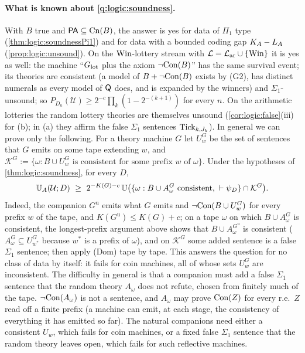 \paragraph{What is known about \cref{q:logic:soundness}.} With $B$ true and $\mathsf{PA}\subseteq\mathrm{Cn}(B)$, the answer is yes for data of $\Pi_1$ type (\cref{thm:logic:soundnessPi1}) and for data with a bounded coding gap $K_{A}-L_{A}$ (\cref{prop:logic:unsound}). On the $\mathrm{Win}$-lottery stream with $\mathcal L=\mathcal{L}_{\mathrm{ar}}\cup\{\mathrm{Win}\}$ it is yes as well: the machine ``$G_{\mathrm{lot}}$ plus the axiom $\neg\mathrm{Con}(B)$'' has the same survival event; its theories are consistent (a model of $B+\neg\mathrm{Con}(B)$ exists by (G2), has distinct numerals as every model of $\mathsf{Q}$ does, and is expanded by the winners) and $\Sigma_1$-unsound; so $P_{D_n}(\mathcal U)\ge2^{-c}\prod_k(1-2^{-(k+1)})$ for every $n$. On the arithmetic lotteries the random lottery theories are themselves unsound (\cref{cor:logic:false}(iii) for (b); in (a) they affirm the false $\Sigma_1$ sentences $\mathrm{Tick}_{k,J_k}$). In general we can prove only the following. For a theory machine $G$ let $U^G_w$ be the set of sentences that $G$ emits on some tape extending $w$, and $\mathcal K^G:=\{\omega:B\cup U^G_w\text{ is consistent for some prefix }w\text{ of }\omega\}$. Under the hypotheses of \cref{thm:logic:soundness}, for every $D$,
\[
\UA(\mathcal U;D)\ \ge\ 2^{-K(G)-c}\,\Unif\big(\{\omega:B\cup A^G_\omega\text{ consistent},\ \vdash\psi_D\}\cap\mathcal K^G\big).
\]
Indeed, the companion $G^{\mathrm u}$ emits what $G$ emits and $\neg\mathrm{Con}(B\cup U^G_w)$ for every prefix $w$ of the tape, and $K(G^{\mathrm u})\le K(G)+c$; on a tape $\omega$ on which $B\cup A^G_\omega$ is consistent, the longest-prefix argument above shows that $B\cup A^{G^{\mathrm u}}_\omega$ is consistent ($A^G_\omega\subseteq U^G_{w^*}$ because $w^*$ is a prefix of $\omega$), and on $\mathcal K^G$ some added sentence is a false $\Sigma_1$ sentence; then apply (Dom) tape by tape. This answers the question for no class of data by itself: it fails for coin machines, all of whose sets $U^G_w$ are inconsistent. The difficulty in general is that a companion must add a false $\Sigma_1$ sentence that the random theory $A_\omega$ does not refute, chosen from finitely much of the tape. $\neg\mathrm{Con}(A_\omega)$ is not a sentence, and $A_\omega$ may prove $\mathrm{Con}(Z)$ for every r.e.\ $Z$ read off a finite prefix (a machine can emit, at each stage, the consistency of everything it has emitted so far). The natural companions need either a consistent $U_w$, which fails for coin machines, or a fixed false $\Sigma_1$ sentence that the random theory leaves open, which fails for such reflective machines.

